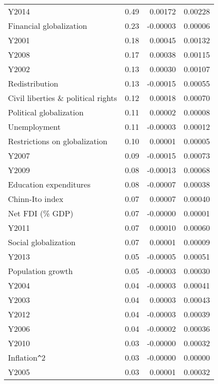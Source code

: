\documentclass[a4paper,11pt]{article}
\begin{document}
\begin{table}[!ht]
\begin{tabular}{lrrr}
      Y2014 & 0.49 & 0.00172 & 0.00228 \\
      Financial globalization & 0.23 & -0.00003 & 0.00006 \\
      Y2001 & 0.18 & 0.00045 & 0.00132 \\
      Y2008 & 0.17 & 0.00038 & 0.00115 \\
      Y2002 & 0.13 & 0.00030 & 0.00107 \\
      Redistribution & 0.13 & -0.00015 & 0.00055 \\
      Civil liberties \& political rights & 0.12 & 0.00018 & 0.00070 \\
      Political globalization & 0.11 & 0.00002 & 0.00008 \\
      Unemployment & 0.11 & -0.00003 & 0.00012 \\
      Restrictions on globalization & 0.10 & 0.00001 & 0.00005 \\
      Y2007 & 0.09 & -0.00015 & 0.00073 \\
      Y2009 & 0.08 & -0.00013 & 0.00068 \\
      Education expenditures & 0.08 & -0.00007 & 0.00038 \\
      Chinn-Ito index & 0.07 & 0.00007 & 0.00040 \\
      Net FDI (\% GDP) & 0.07 & -0.00000 & 0.00001 \\
      Y2011 & 0.07 & 0.00010 & 0.00060 \\
      Social globalization & 0.07 & 0.00001 & 0.00009 \\
      Y2013 & 0.05 & -0.00005 & 0.00051 \\
      Population growth & 0.05 & -0.00003 & 0.00030 \\
      Y2004 & 0.04 & -0.00003 & 0.00041 \\
      Y2003 & 0.04 & 0.00003 & 0.00043 \\
      Y2012 & 0.04 & -0.00003 & 0.00039 \\
      Y2006 & 0.04 & -0.00002 & 0.00036 \\
      Y2010 & 0.03 & -0.00000 & 0.00032 \\
      Inflation\verb|^|2 & 0.03 & -0.00000 & 0.00000 \\
      Y2005 & 0.03 & 0.00001 & 0.00032 \\
    \end{tabular}
    \end{table}
%
\clearpage
%
\end{document}
